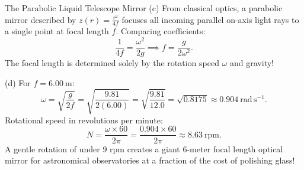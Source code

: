 \begin{workedexample}{The Parabolic Liquid Telescope Mirror}
(c) From classical optics, a parabolic mirror described by $z(r) = \frac{r^2}{4f}$ focuses all incoming parallel on-axis light rays to a single point at focal length $f$.
Comparing coefficients:
\[
\frac{1}{4f} = \frac{\omega^2}{2g} \implies \boxed{f = \frac{g}{2\omega^2}.}
\]
The focal length is determined solely by the rotation speed $\omega$ and gravity!

(d) For $f = 6.00\ \mathrm{m}$:
\[
\omega = \sqrt{\frac{g}{2f}} = \sqrt{\frac{9.81}{2(6.00)}} = \sqrt{\frac{9.81}{12.0}} = \sqrt{0.8175} \approx \mathbf{0.904\ \mathrm{rad\,s^{-1}}.}
\]
Rotational speed in revolutions per minute:
\[
N = \frac{\omega\times 60}{2\pi} = \frac{0.904\times 60}{2\pi} \approx \mathbf{8.63\ \mathrm{rpm}.}
\]
A gentle rotation of under $9$ rpm creates a giant $6$-meter focal length optical mirror for astronomical observatories at a fraction of the cost of polishing glass!
\end{workedexample}

